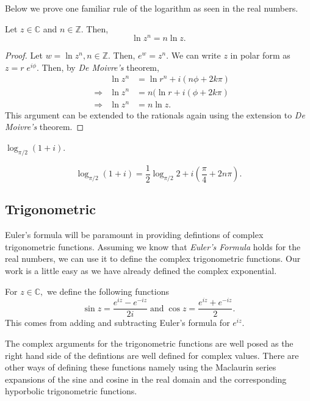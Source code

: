 \documentclass[12pt]{book}
\begin{document}
Below we prove one familiar rule of the logarithm as seen in the real numbers. 
\begin{thm}
    Let $z \in \mathbb{C}$ and $n \in \mathbb{Z}.$ Then, 
    \[
        \ln z^n = n\ln z.
    \]
\end{thm}
\begin{proof}
    Let $w = \ln z^n, n \in \mathbb{Z}.$ Then, $e^{w} = z^{n}.$ We can write $z$ in polar form as $z = r\;e^{i\phi}.$ Then, by \textit{De Moivre's} theorem,
    \begin{align*}
        &&\ln z^n 
            &= 
                \ln r^{n} + i \left(n\phi + 2k\pi\right)\\ 
        &\Rightarrow &\ln z^{n}
            &=
                n (\ln r +  i\left(\phi + 2k\pi\right)\\
        &\Rightarrow &\ln z^{n}
            &=
                n \ln z.
    \end{align*}
This argument can be extended to the rationals again using the extension to \textit{De Moivre's} theorem.
\end{proof}

\begin{exmp}
    $\log_{\pi/2}(1 + i).$
\end{exmp}
\[
    \log_{\pi/2}(1 + i) = \frac{1}{2}\log_{\pi / 2} 2  + i\left(\frac{\pi}{4} + 2n\pi\right).
\]

\subsection{Trigonometric}
Euler's formula will be paramount in providing defintions of complex trigonometric functions. Assuming we know that \textit{Euler's Formula} holds for the real numbers, we can use it to define the complex trigonometric functions. Our work is a little easy as we have already defined the complex exponential.
\begin{defn}
    For $z \in \mathbb{C}, $ we define the following functions
    \[
        \sin z = \frac{e^{iz} - e^{-iz}}{2i}
        \;\text{and}\;
        \cos z = \frac{e^{iz} + e^{-iz}}{2}.
    \]
    This comes from adding and subtracting Euler's formula for $e^{iz}.$
\end{defn}
The complex arguments for the trigonometric functions are well posed as the right hand side of the defintions are well defined for complex values. There are other ways of defining these functions namely using the Maclaurin series expansions of the sine and cosine in the real domain and the corresponding hyporbolic trigonometric functions.
\end{document}
